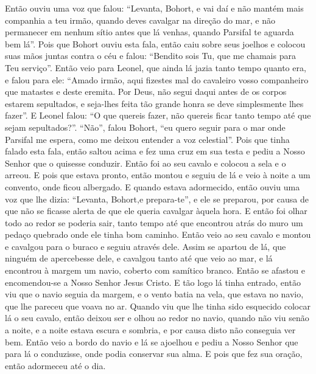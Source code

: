 Então ouviu uma voz que falou: “Levanta, Bohort, e vai daí e não mantém mais
companhia a teu irmão, quando deves cavalgar na direção do mar, e não
permanecer em nenhum sítio antes que lá venhas, quando Parsifal te aguarda bem
lá”. Pois que Bohort ouviu esta fala, então caiu sobre seus joelhos e
colocou suas mãos juntas contra o céu e falou: “Bendito sois Tu, que me chamais
para Teu serviço”. Então veio para Leonel, que ainda lá jazia tanto tempo
quanto era, e falou para ele: “Amado irmão, aqui fizestes mal do cavaleiro
vosso companheiro que matastes e deste eremita. Por Deus, não segui daqui antes
de os corpos estarem sepultados, e seja-lhes feita tão grande honra se deve
simplesmente lhes fazer”. E Leonel falou: “O que quereis fazer, não quereis
ficar tanto tempo até que sejam sepultados?”. “Não”, falou Bohort, “eu quero
seguir para o mar onde Parsifal me espera, como me deixou entender a voz
celestial”. Pois que tinha falado esta fala, então saltou acima e fez uma cruz
em sua testa e pediu a Nosso Senhor que o quisesse conduzir. Então foi ao seu
cavalo e colocou a sela e o arreou. E pois que estava pronto, então montou e
seguiu de lá e veio à noite a um convento, onde ficou albergado. E quando
estava adormecido, então ouviu uma voz que lhe dizia: “Levanta, Bohort,e
prepara-te”,  e ele se preparou, por causa de que não se ficasse alerta
de que ele queria cavalgar àquela hora. E então foi olhar todo ao redor se
poderia sair, tanto tempo até que encontrou atrás do muro um pedaço quebrado
onde ele tinha bom caminho. Então veio ao seu cavalo e montou e cavalgou para o
buraco e seguiu através dele. Assim se apartou de lá, que ninguém de
apercebesse dele, e cavalgou tanto até que veio ao mar, e lá encontrou à margem
um navio, coberto com samítico branco. Então se afastou e encomendou-se a Nosso
Senhor Jesus Cristo. E tão logo lá tinha entrado, então viu que o navio seguia
da margem, e o vento batia na vela, que estava no navio, que lhe pareceu que
voava no ar. Quando viu que lhe tinha sido esquecido colocar lá o seu cavalo,
então deixou ser e olhou ao redor no navio, quando não viu senão a noite, e a
noite estava escura e sombria, e por causa disto não conseguia ver bem. Então
veio a bordo do navio e lá se ajoelhou e pediu a Nosso Senhor que para lá o
conduzisse, onde podia conservar sua alma. E pois que fez sua oração, então
adormeceu até o dia.

